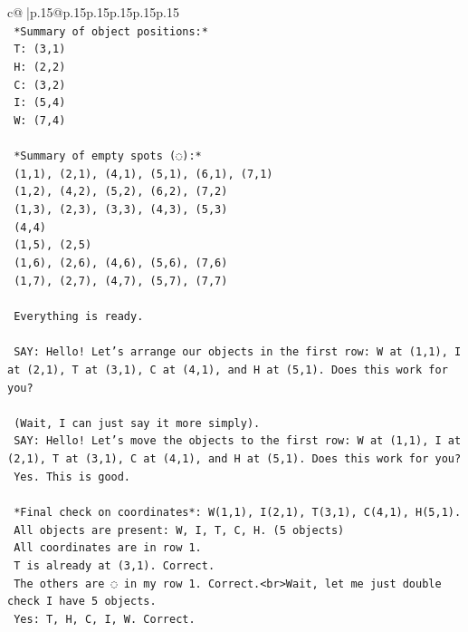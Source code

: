 \documentclass{article}
\begin{document}
{\begin{supertabular}{c@{$\;$}|p{.15\linewidth}@{}p{.15\linewidth}p{.15\linewidth}p{.15\linewidth}p{.15\linewidth}p{.15\linewidth}}
{{{\\ 
\texttt{    *Summary of object positions:*} \\
\texttt{    T: (3,1)} \\
\texttt{    H: (2,2)} \\
\texttt{    C: (3,2)} \\
\texttt{    I: (5,4)} \\
\texttt{    W: (7,4)} \\
\\ 
\texttt{    *Summary of empty spots (◌):*} \\
\texttt{    (1,1), (2,1), (4,1), (5,1), (6,1), (7,1)} \\
\texttt{    (1,2), (4,2), (5,2), (6,2), (7,2)} \\
\texttt{    (1,3), (2,3), (3,3), (4,3), (5,3)} \\
\texttt{    (4,4)} \\
\texttt{    (1,5), (2,5)} \\
\texttt{    (1,6), (2,6), (4,6), (5,6), (7,6)} \\
\texttt{    (1,7), (2,7), (4,7), (5,7), (7,7)} \\
\\ 
\texttt{    Everything is ready.} \\
\\ 
\texttt{    SAY: Hello! Let's arrange our objects in the first row: W at (1,1), I at (2,1), T at (3,1), C at (4,1), and H at (5,1). Does this work for you?} \\
\\ 
\texttt{    (Wait, I can just say it more simply).} \\
\texttt{    SAY: Hello! Let's move the objects to the first row: W at (1,1), I at (2,1), T at (3,1), C at (4,1), and H at (5,1). Does this work for you?} \\
\texttt{    Yes. This is good.} \\
\\ 
\texttt{    *Final check on coordinates*: W(1,1), I(2,1), T(3,1), C(4,1), H(5,1).} \\
\texttt{    All objects are present: W, I, T, C, H. (5 objects)} \\
\texttt{    All coordinates are in row 1.} \\
\texttt{    T is already at (3,1). Correct.} \\
\texttt{    The others are ◌ in my row 1. Correct.<br>Wait, let me just double check I have 5 objects.} \\
\texttt{    Yes: T, H, C, I, W. Correct.} \\
}}}
\end{supertabular}}
\end{document}
